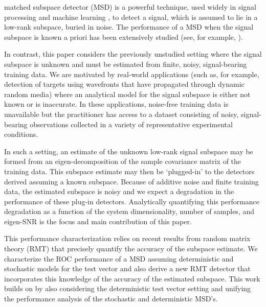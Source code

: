  matched subspace detector (MSD) is a powerful technique, used widely in signal processing  \cite{scharf1991statistical} and machine learning \cite{friedman2001elements}, to detect a signal, which is assumed to lie in a low-rank subspace, buried in noise. The performance of a MSD when the signal subspace is known a priori has been extensively studied (see, for example, \cite{scharf1994matched,jin2005cfar,mcwhorter2003matched, vincent2008matched,besson2006cfar}).

\begin{comment}
 In particular, \cite{scharf1994matched} and \cite{vincent2008matched} consider the setting where the signal lies at a fixed but unknown position in the known subspace. Scharf and Friedlander \cite{scharf1994matched} show that for this setting, the generalized likelihood ratio test (GLRT) is the uniformly most powerful invariant detector. The stochastic setting, considered in \cite{jin2005cfar} and \cite{mcwhorter2003matched}, assumes that the signal is placed randomly in the known subspace.
\end{comment}

In contrast, this paper considers the previously unstudied setting where the signal subspace is unknown and must be estimated from finite, noisy, signal-bearing training data. We are motivated by real-world applications (such as, for example, detection of targets using wavefronts that have propagated through dynamic random media) where an analytical model for the signal subspace is either not known or is inaccurate. In these applications, noise-free training data is unavailable but the practitioner has access to a dataset consisting of noisy, signal-bearing observations collected in a variety of representative  experimental conditions.

In such a setting, an estimate of the unknown low-rank signal subspace may be formed from an eigen-decomposition of the sample covariance matrix of the training data. This subspace estimate may then be `plugged-in' to the detectors derived assuming a known subspace. Because of additive noise and finite training data, the estimated subspace is noisy and we expect a degradation in the performance of these plug-in detectors. Analytically quantifying this performance degradation as a function of the system dimensionality, number of samples, and eigen-SNR is the focus and main contribution of this paper.

This performance characterization relies on recent results from random matrix theory (RMT) \cite{paul2007asymptotics,benaych2011eigenvalues} that precisely quantify the accuracy of the subspace estimate. We characterize the ROC performance of a MSD assuming deterministic and stochastic models for the test vector and also derive a new RMT detector that incorporates this knowledge of the accuracy of the estimated subspace. This work builds on \cite{asendorf2011msd} by also considering the deterministic test vector setting and unifying the performance analysis of the stochastic and deterministic MSD's.

